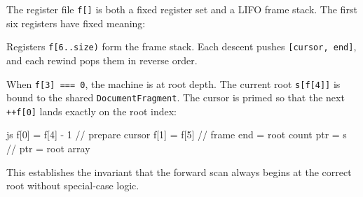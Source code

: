 \begin{NxLightBox}[title={Detailed Register Semantics}]
	\begin{NxLightP}
		The register file \texttt{f[]} is both a fixed register set and a LIFO frame stack. The first six registers have fixed meaning:
	\end{NxLightP}

	\begin{NxLightList}
	\end{NxLightList}

	\begin{NxLightP}
		Registers \texttt{f[6..size)} form the frame stack. Each descent pushes \texttt{[cursor, end]}, and each rewind pops them in reverse order.
	\end{NxLightP}
\end{NxLightBox}

\begin{NxLightBox}[title={Phase 1 -- Root Initialization}]
	\begin{NxLightP}
		When \texttt{f[3] === 0}, the machine is at root depth. The current root \texttt{s[f[4]]} is bound to the shared \texttt{DocumentFragment}. The cursor is primed so that the next \texttt{++f[0]} lands exactly on the root index:
	\end{NxLightP}

	\begin{NxCodeBox}{js}{}
f[0] = f[4] - 1	  // prepare cursor
f[1] = f[5]		  // frame end = root count
ptr  = s			 // ptr = root array
	\end{NxCodeBox}

	\begin{NxLightP}
		This establishes the invariant that the forward scan always begins at the correct root without special‑case logic.
	\end{NxLightP}
\end{NxLightBox}

